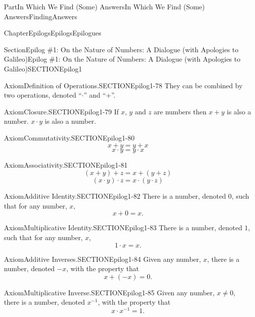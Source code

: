 \documentclass[oneside,10pt,]{book}
\numberwithin{equation}{part}
\begin{document}
\begin{partptx}{Part}{In Which We Find (Some) Answers}{}{In Which We Find (Some) Answers}{}{}{FindingAnswers}
\begin{chapterptx}{Chapter}{Epilogs}{}{Epilogs}{}{}{Epilogues}
\begin{sectionptx}{Section}{Epilog \#1: On the Nature of Numbers: A Dialogue (with Apologies to Galileo)}{}{Epilog \#1: On the Nature of Numbers: A Dialogue (with Apologies to Galileo)}{}{}{SECTIONEpilog1}
\begin{axiom}{Axiom}{Definition of Operations.}{}{SECTIONEpilog1-78}
They can be combined by two operations, denoted ``\(\cdot\)'' and ``+''.%
\end{axiom}
\begin{axiom}{Axiom}{Closure.}{}{SECTIONEpilog1-79}%
If \(x\), \(y\) and \(z\) are numbers then \(x+y\) is also a number. \(x\cdot y\) is also a number.%
\end{axiom}
\begin{axiom}{Axiom}{Commutativity.}{}{SECTIONEpilog1-80}%
%
\begin{equation*}
x+y=y+x
\end{equation*}
%
\begin{equation*}
x\cdot y=y\cdot x
\end{equation*}
%
\end{axiom}
\begin{axiom}{Axiom}{Associativity.}{}{SECTIONEpilog1-81}%
%
\begin{equation*}
(x+y)+z=x+(y+z)
\end{equation*}
%
\begin{equation*}
(x\cdot y)\cdot z = x\cdot(y\cdot z)
\end{equation*}
%
\end{axiom}
\begin{axiom}{Axiom}{Additive Identity.}{}{SECTIONEpilog1-82}%
There is a number, denoted \(0\), such that for any number, \(x\),%
\begin{equation*}
x+0=x\text{.}
\end{equation*}
%
\end{axiom}
\begin{axiom}{Axiom}{Multiplicative Identity.}{}{SECTIONEpilog1-83}%
There is a number, denoted \(1\), such that for any number, \(x\),%
\begin{equation*}
1\cdot x=x\text{.}
\end{equation*}
%
\end{axiom}
\begin{axiom}{Axiom}{Additive Inverses.}{}{SECTIONEpilog1-84}%
Given any number, \(x\), there is a number, denoted \(-x\), with the property that%
\begin{equation*}
x+(-x)=0\text{.}
\end{equation*}
%
\end{axiom}
\begin{axiom}{Axiom}{Multiplicative Inverse.}{}{SECTIONEpilog1-85}%
Given any number, \(x\ne0\), there is a number, denoted \(x^{-1}\), with the property that%
\begin{equation*}
x\cdot x^{-1} =1\text{.}
\end{equation*}

\end{axiom}
\end{sectionptx}
\end{chapterptx}
\end{partptx}
\end{document}

